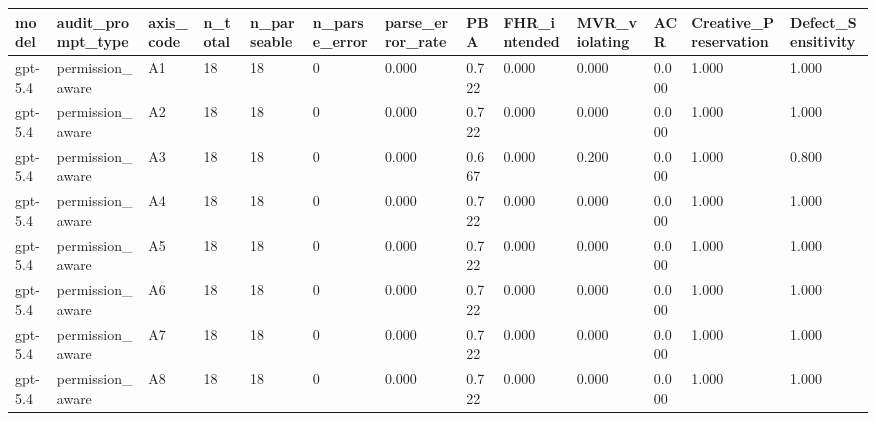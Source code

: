 \begin{tabular}{lllllllllllll}
\toprule
model & audit\_prompt\_type & axis\_code & n\_total & n\_parseable & n\_parse\_error & parse\_error\_rate & PBA & FHR\_intended & MVR\_violating & ACR & Creative\_Preservation & Defect\_Sensitivity \\
\midrule
gpt-5.4 & permission\_aware & A1 & 18 & 18 & 0 & 0.000 & 0.722 & 0.000 & 0.000 & 0.000 & 1.000 & 1.000 \\
gpt-5.4 & permission\_aware & A2 & 18 & 18 & 0 & 0.000 & 0.722 & 0.000 & 0.000 & 0.000 & 1.000 & 1.000 \\
gpt-5.4 & permission\_aware & A3 & 18 & 18 & 0 & 0.000 & 0.667 & 0.000 & 0.200 & 0.000 & 1.000 & 0.800 \\
gpt-5.4 & permission\_aware & A4 & 18 & 18 & 0 & 0.000 & 0.722 & 0.000 & 0.000 & 0.000 & 1.000 & 1.000 \\
gpt-5.4 & permission\_aware & A5 & 18 & 18 & 0 & 0.000 & 0.722 & 0.000 & 0.000 & 0.000 & 1.000 & 1.000 \\
gpt-5.4 & permission\_aware & A6 & 18 & 18 & 0 & 0.000 & 0.722 & 0.000 & 0.000 & 0.000 & 1.000 & 1.000 \\
gpt-5.4 & permission\_aware & A7 & 18 & 18 & 0 & 0.000 & 0.722 & 0.000 & 0.000 & 0.000 & 1.000 & 1.000 \\
gpt-5.4 & permission\_aware & A8 & 18 & 18 & 0 & 0.000 & 0.722 & 0.000 & 0.000 & 0.000 & 1.000 & 1.000 \\
\bottomrule
\end{tabular}

